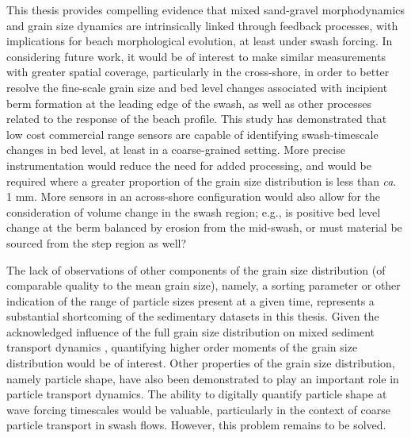 This thesis provides compelling evidence that mixed sand-gravel morphodynamics and grain size dynamics are intrinsically linked through feedback processes, with implications for beach morphological evolution, at least under swash forcing. In considering future work, it would be of interest to make similar measurements with greater spatial coverage, particularly in the cross-shore, in order to better resolve the fine-scale grain size and bed level changes associated with incipient berm formation at the leading edge of the swash, as well as other processes related to the response of the beach profile. This study has demonstrated that low cost commercial range sensors are capable of identifying swash-timescale changes in bed level, at least in a coarse-grained setting. More precise instrumentation would reduce the need for added processing, and would be required where a greater proportion of the grain size distribution is less than \textit{ca}. 1 mm. More sensors in an across-shore configuration would also allow for the consideration of volume change in the swash region; e.g., is positive bed level change at the berm balanced by erosion from the mid-swash, or must material be sourced from the step region as well?

The lack of observations of other components of the grain size distribution (of comparable quality to the mean grain size), namely, a sorting parameter or other indication of the range of particle sizes present at a given time, represents a substantial shortcoming of the sedimentary datasets in this thesis. Given the acknowledged influence of the full grain size distribution on mixed sediment transport dynamics \citep[e.g., the increased mobility of gravel-sized particles in the presence of a large sand fraction;][]{Wilcock_etal2001}, quantifying higher order moments of the grain size distribution would be of interest. Other properties of the grain size distribution, namely particle shape, have also been demonstrated to play an important role in particle transport dynamics. The ability to digitally quantify particle shape at wave forcing timescales would be valuable, particularly in the context of coarse particle transport in swash flows. However, this problem remains to be solved.

